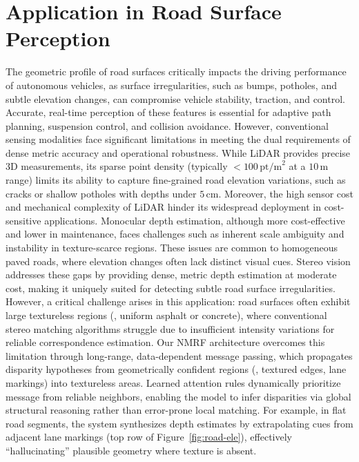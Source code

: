 \section{Application in Road Surface Perception}
The geometric profile of road surfaces critically impacts the driving performance of autonomous vehicles, as surface irregularities, such as bumps, potholes, and subtle elevation changes, can compromise vehicle stability, traction, and control.
Accurate, real-time perception of these features is essential for adaptive path planning, suspension control, and collision avoidance.
However, conventional sensing modalities face significant limitations in meeting the dual requirements of dense metric accuracy and operational robustness.
While LiDAR provides precise 3D measurements, its sparse point density (typically $< 100\,\mathrm{pt/m}^2$ at a $10\,\mathrm{m}$ range) limits its ability to capture fine-grained road elevation variations, such as cracks or shallow potholes with depths under $5\,\mathrm{cm}$.
Moreover, the high sensor cost and mechanical complexity of LiDAR hinder its widespread deployment in cost-sensitive applications.
Monocular depth estimation, although more cost-effective and lower in maintenance, faces challenges such as inherent scale ambiguity and instability in texture-scarce regions.
These issues are common to homogeneous paved roads, where elevation changes often lack distinct visual cues. Stereo vision addresses these gaps by providing dense, metric depth estimation at moderate cost, making it uniquely suited for detecting subtle road surface irregularities.
However, a critical challenge arises in this application: road surfaces often exhibit large textureless regions (\eg, uniform asphalt or concrete), where conventional stereo matching algorithms struggle due to insufficient intensity variations for reliable correspondence estimation.
Our NMRF architecture overcomes this limitation through long-range, data-dependent message passing, which propagates disparity hypotheses from geometrically confident regions (\eg, textured edges, lane markings) into textureless areas. 
Learned attention rules dynamically prioritize message from reliable neighbors, enabling the model to infer disparities via global structural reasoning rather than error-prone local matching.
For example, in flat road segments, the system synthesizes depth estimates by extrapolating cues from adjacent lane markings (top row of Figure~\ref{fig:road-ele}), effectively ``hallucinating'' plausible geometry where texture is absent.

